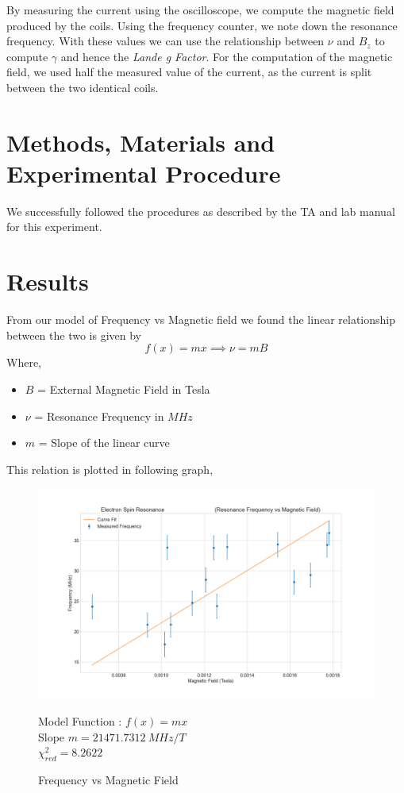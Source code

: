 \documentclass[letterpaper,12pt]{article}
\begin{document}
By measuring the current using the oscilloscope, we compute the magnetic field produced by the coils. Using the frequency counter, we note down the
resonance frequency. With these values we can use the relationship between $\nu$ and $B_z$ to compute $\gamma$ and hence the 
\emph{Lande g Factor}. For the computation of the magnetic field, we used half the measured value of the current, as the current is split between 
the two identical coils.

\section{Methods, Materials and Experimental Procedure}

We successfully followed the procedures as described by the TA and lab manual \cite{lab-manual-ex6} for this experiment.

\section{Results}

From our model of Frequency vs Magnetic field we found the linear relationship between the two is given 
by 
$$f(x) = mx \implies \nu = mB$$
Where,
\begin{itemize}
  \item[] $B$ = External Magnetic Field in Tesla
  \item[] $\nu$ = Resonance Frequency in $MHz$
  \item[] $m$ = Slope of the linear curve 
\end{itemize}

This relation is plotted in following graph,

\begin{figure}[H]
  \centering
  \includegraphics[width=0.95\linewidth]{../code/Pankaj/lab6_freq_vs_magnetic_field.png}    
  \begin{center}
    \begin{center}
      Model Function : $f(x) = mx$ \\
      Slope $m = 21471.7312\ MHz / T$\\
      $\chi_{red}^2 = 8.2622$
    \end{center}  \end{center}
  \caption{Frequency vs Magnetic Field}
  \label{frq-vs-b}
\end{figure}
\end{document}
